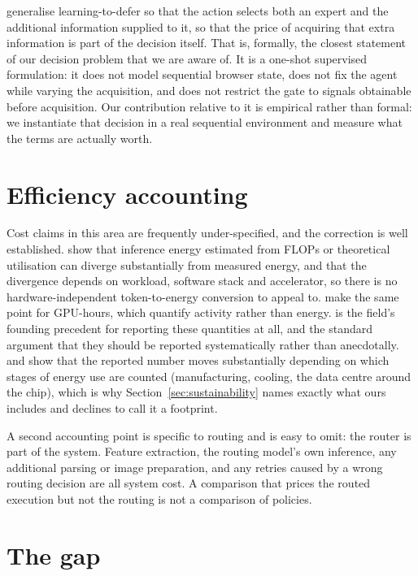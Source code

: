 \citet{montreuil2026defer} generalise learning-to-defer so that the action
selects both an expert and the additional information supplied to it, so that
the price of acquiring that extra information is part of the decision itself. That is, formally, the closest
statement of our decision problem that we are aware of. It is a one-shot
supervised formulation: it does not model sequential browser state, does not fix
the agent while varying the acquisition, and does not restrict the gate to
signals obtainable before acquisition. Our contribution relative to it is empirical rather than formal: we instantiate that decision in a real
sequential environment and measure what the terms are actually worth.

\section{Efficiency accounting}
\label{sec:bg-efficiency}

Cost claims in this area are frequently under-specified, and the correction is
well established. \citet{fernandez2025energy} show that inference energy
estimated from FLOPs or theoretical utilisation can diverge substantially from
measured energy, and that the divergence depends on workload, software stack and accelerator, so there is no hardware-independent token-to-energy conversion
to appeal to. \citet{lannelongue2021green} make the same point for GPU-hours,
which quantify activity rather than energy. \citet{strubell2019energy} is the
field's founding precedent for reporting these quantities at all, and
\citet{henderson2020systematic} the standard argument that they should be
reported systematically rather than anecdotally. \citet{luccioni2022bloom} and
\citet{gupta2022chasing} show that the reported number moves substantially
depending on which stages of energy use are counted (manufacturing,
cooling, the data centre around the chip), which is why
Section~\ref{sec:sustainability} names exactly what ours includes and declines
to call it a footprint.

A second accounting point is specific to routing and is easy to omit: the router
is part of the system. Feature extraction, the routing model's own inference,
any additional parsing or image preparation, and any retries caused by a wrong
routing decision are all system cost. A comparison that prices the routed
execution but not the routing is not a comparison of policies.

\section{The gap}
\label{sec:gap}

